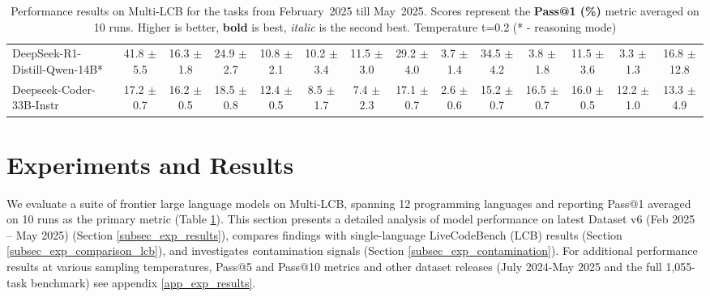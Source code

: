 \documentclass{llmxive}
\begin{document}
\begin{table}[t]
{\begin{tabular}{l *{13}{c}}
\rowcolor{gray!10}
 DeepSeek-R1-Distill-Qwen-14B* &
41.8 {\tiny$\pm$ 5.5} & 
16.3 {\tiny$\pm$ 1.8} & 
24.9 {\tiny$\pm$ 2.7} & 
10.8 {\tiny$\pm$ 2.1} &
10.2 {\tiny$\pm$ 3.4} & 
11.5 {\tiny$\pm$ 3.0} & 
29.2 {\tiny$\pm$ 4.0} & 
3.7 {\tiny$\pm$ 1.4} &
34.5 {\tiny$\pm$ 4.2} & 
3.8 {\tiny$\pm$ 1.8} & 
11.5 {\tiny$\pm$ 3.6} & 
3.3 {\tiny$\pm$ 1.3} &
16.8 {\tiny$\pm$ 12.8} \\



Deepseek-Coder-33B-Instr 
 & 17.2 {\tiny$\pm$ 0.7} & 
 16.2 {\tiny$\pm$ 0.5} & 
 18.5 {\tiny$\pm$ 0.8} & 
 12.4 {\tiny$\pm$ 0.5} & 
 8.5 {\tiny$\pm$ 1.7} & 
 7.4 {\tiny$\pm$ 2.3} & 
 17.1 {\tiny$\pm$ 0.7} & 
 2.6 {\tiny$\pm$ 0.6} & 
 15.2 {\tiny$\pm$ 0.7} & 
 16.5 {\tiny$\pm$ 0.7} & 
 16.0 {\tiny$\pm$ 0.5} & 
 12.2 {\tiny$\pm$ 1.0} & 
 13.3 {\tiny$\pm$ 4.9} \\


\bottomrule
\end{tabular}%
}
\caption{Performance results on Multi-LCB for the tasks from February~2025 till May~2025.
Scores represent the \textbf{Pass@1 (\%)} metric averaged on 10 runs. Higher is better, \textbf{bold} is best, \textit{italic} is the second best. Temperature t=0.2 (* - reasoning mode)}
\label{tab_exps_feb25_pass1_avg10_t0.2}
\end{table}


\section{Experiments and Results}
\label{sec_exp_results}



We evaluate a suite of frontier large language models on Multi-LCB, spanning 12 programming languages and reporting Pass@1 averaged on 10 runs as the primary metric (Table \ref{tab_exps_feb25_pass1_avg10_t0.2}). 
This section presents a detailed analysis of model performance on  latest Dataset v6 (Feb 2025 -- May 2025) (Section \ref{subsec_exp_results}), compares findings with single-language LiveCodeBench (LCB) results (Section \ref{subsec_exp_comparison_lcb}), and investigates contamination signals (Section \ref{subsec_exp_contamination}).  
For additional performance results at various sampling temperatures, Pass@5 and Pass@10 metrics and other dataset releases (July 2024-May 2025 and the full 1,055-task benchmark) see appendix \ref{app_exp_results}.
\end{document}
